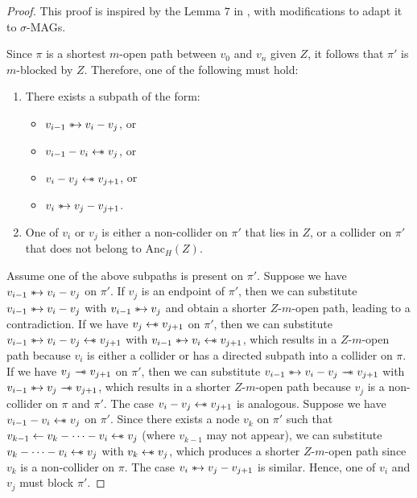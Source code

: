 \documentclass[accepted]{uai2025} %
\newcommand{\anc}{\text{Anc}}
\newcommand{\hus}{\mathrel{{\leftarrow\mkern-11mu\ast}}}
\newcommand{\suh}{\mathrel{{\ast\mkern-11mu\to}}}
\newcommand{\tus}{\mathrel{{\relbar\mkern-11mu\relbar\mkern-11mu\ast}}}
\begin{document}
\lemmaseven*
\begin{proof}
This proof is inspired by the Lemma $7$ in \citep{spirtes1996polynomial}, with modifications to adapt it to \( \sigma \)-MAGs.

Since $\pi$ is a shortest $m$-open path between $v_0$ and $v_n$ given $Z$, it follows that $\pi'$ is $m$-blocked by $Z$. Therefore, one of the following must hold:
\begin{enumerate}
    \item There exists a subpath of the form:
    \begin{itemize}
        \item \( v_{i-1} \suh v_i - v_j \), or
        \item \( v_{i-1} - v_i \hus  v_j \), or
        \item \( v_i - v_j \hus  v_{j+1} \), or
        \item \( v_i \suh v_j - v_{j+1} \).
    \end{itemize}
    \item One of \( v_i \) or \( v_j \) is either a non-collider on \( \pi' \) that lies in \( Z \), or a collider on \( \pi' \) that does not belong to \( \anc_H(Z) \).
\end{enumerate}

Assume one of the above subpaths is present on \( \pi' \). Suppose we have \( v_{i-1} \suh v_i - v_j \) on \( \pi' \). If \( v_j \) is an endpoint of \( \pi' \), then we can substitute \( v_{i-1} \suh v_i - v_j \) with \( v_{i-1} \suh v_j \) and obtain a shorter \( Z \)-$m$-open path, leading to a contradiction. If we have \( v_j \hus  v_{j+1} \) on \( \pi' \), then we can substitute \( v_{i-1} \suh v_i - v_j \hus  v_{j+1} \) with \( v_{i-1} \suh v_i \hus  v_{j+1} \), which results in a \( Z \)-$m$-open path because \( v_i \) is either a collider or has a directed subpath into a collider on \( \pi \). If we have \( v_j \tus  v_{j+1} \) on \( \pi' \), then we can substitute \( v_{i-1} \suh v_i - v_j \tus  v_{j+1} \) with \( v_{i-1} \suh v_j \tus  v_{j+1} \), which results in a shorter \( Z \)-$m$-open path because \( v_j \) is a non-collider on $\pi$ and \( \pi' \). The case \( v_i - v_j \hus  v_{j+1} \) is analogous. Suppose we have \( v_{i-1} - v_i \hus  v_j \) on \( \pi' \). Since there exists a node \( v_k \) on \( \pi' \) such that \( v_{k-1} \leftarrow v_k - \cdots - v_i \hus  v_j \) (where \( v_{k-1} \) may not appear), we can substitute \( v_k - \cdots - v_i \hus  v_j \) with \( v_k \hus  v_j \), which produces a shorter \( Z \)-$m$-open path since \( v_k \) is a non-collider on \( \pi \). The case \( v_i \suh v_j - v_{j+1} \) is similar. Hence, one of \( v_i \) and \( v_j \) must block \( \pi' \).


\end{proof}
\end{document}
